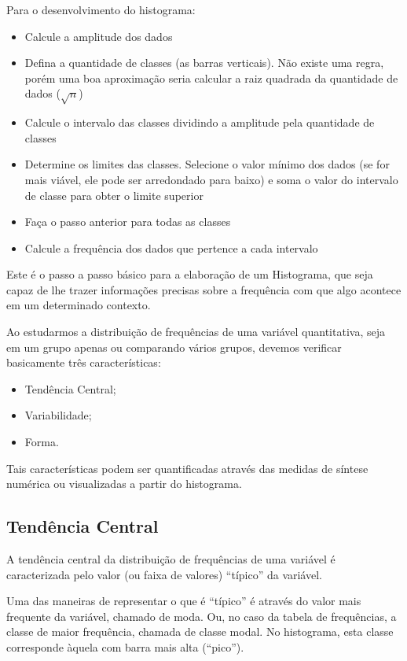 \documentclass[
]{book}
\providecommand{\tightlist}{%
  \setlength{\itemsep}{0pt}\setlength{\parskip}{0pt}}
\begin{document}
Para o desenvolvimento do histograma:

\begin{itemize}
\tightlist
\item
  Calcule a amplitude dos dados
\item
  Defina a quantidade de classes (as barras verticais). Não existe uma regra, porém uma boa aproximação seria calcular a raiz quadrada da quantidade de dados (\(\sqrt n\))
\item
  Calcule o intervalo das classes dividindo a amplitude pela quantidade de classes
\item
  Determine os limites das classes. Selecione o valor mínimo dos dados (se for mais viável, ele pode ser arredondado para baixo) e soma o valor do intervalo de classe para obter o limite superior
\item
  Faça o passo anterior para todas as classes
\item
  Calcule a frequência dos dados que pertence a cada intervalo
\end{itemize}

Este é o passo a passo básico para a elaboração de um Histograma, que seja capaz de lhe trazer informações precisas sobre a frequência com que algo acontece em um determinado contexto.

Ao estudarmos a distribuição de frequências de uma variável quantitativa, seja em um grupo apenas ou comparando vários grupos, devemos verificar basicamente três características:

\begin{itemize}
\tightlist
\item
  Tendência Central;
\item
  Variabilidade;
\item
  Forma.
\end{itemize}

Tais características podem ser quantificadas através das medidas de síntese numérica ou visualizadas a partir do histograma.

\hypertarget{tenduxeancia-central}{%
\subsection{Tendência Central}\label{tenduxeancia-central}}

A tendência central da distribuição de frequências de uma variável é caracterizada pelo valor (ou faixa de valores) ``típico'' da variável.

Uma das maneiras de representar o que é ``típico'' é através do valor mais frequente da variável, chamado de moda. Ou, no caso da tabela de frequências, a classe de maior frequência, chamada de classe modal. No histograma, esta classe corresponde àquela com barra mais alta (``pico'').
\end{document}
